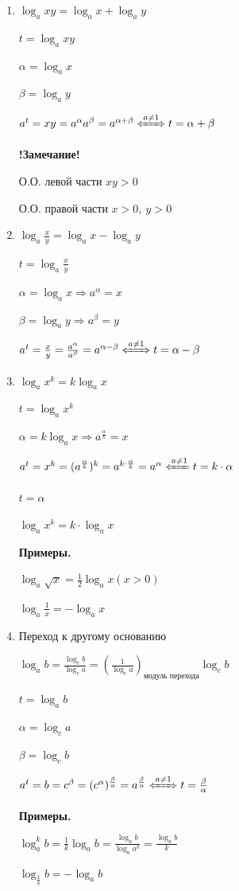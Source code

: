 \documentclass{article}
\begin{document}
    \begin{enumerate}
        \item \(\log_a xy = \log_a x + \log_a y\)

        \( t = \log_a xy \)
        
        \( \alpha = \log_a x \)

        \( \beta = \log_a y \)
        
        \(a^t = xy = a^{\alpha}a^{\beta} = a^{\alpha+\beta} \xLeftrightarrow[]{a \neq 1} t = \alpha + \beta\)

        \textbf{!Замечание!}
        
        О.О. левой части \(xy > 0\)

        О.О. правой части \(x > 0,\ y > 0\)

        \item \( \log_a \frac{x}{y} = \log_a x - \log_a y \)
        
        \( t = \log_a \frac{x}{y} \)
        
        \( \alpha = \log_a x \Rightarrow a^{\alpha} = x \)

        \( \beta = \log_a y \Rightarrow a^{\beta} = y \)

        \( a^t = \frac{x}{y} = \frac{a^{\alpha}}{a^{\beta}} = a^{\alpha - \beta} \xLeftrightarrow[]{a \neq 1} t = \alpha - \beta \)
        
        \item \(\log_a x^k = k\log_a x\)
        
        \( t = \log_a x^k \)

        \( \alpha = k\log_a x \Rightarrow a^{\frac{\alpha}{k}} = x \)
        
        \(a^t = x^k = (a^\frac{\alpha}{k})^k = a^{k \cdot \frac{\alpha}{k}} = a^{\alpha} \xLeftarrow[]{a \neq 1} t = k \cdot \alpha\)

        \( t = \alpha \)

        \( \log_a x^k = k \cdot \log_a x \)

        \textbf{Примеры.}

        \( \log_a \sqrt{x} = \frac{1}{2}\log_a x (x > 0)\)

        \( \log_a \frac{1}{x} = -\log_a x \)
        
        \item Переход к другому основанию

        \(\log_a b = \frac{\log_c b}{\log_c a} = (\frac{1}{\log_c a})_{\textrm{модуль перехода}}\log_c b\)
    
        \( t = \log_a b \)

        \( \alpha = \log_c a \)
        
        \( \beta = \log_c b \) 
        
        \(a^t = b = c^\beta = (c^\alpha)^\frac{\beta}{\alpha} = a^\frac{\beta}{\alpha} \xLeftrightarrow[]{a \neq 1} t = \frac{\beta}{\alpha} \)
    
        \textbf{Примеры.}
        
        \( \log_a^k b = \frac{1}{k}\log_a b = \frac{\log_a b}{\log_a a^k} = \frac{\log_a b}{k}\)

        \( \log_\frac{1}{a} b = -\log_a b \)
    \end{enumerate}
\end{document}
